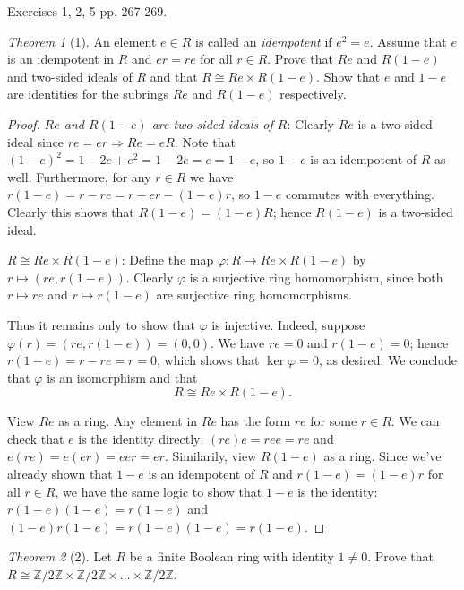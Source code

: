 \documentclass[12pt]{article}
\theoremstyle{remark}
\theoremstyle{named}
\newtheorem*{theorem}{Theorem}
\newcommand{\Z}{\mathbb Z}
\begin{document}
Exercises 1, 2, 5 pp. 267-269.

\begin{theorem}[1]
    An element \(e \in R\) is called an \textit{idempotent} if \(e^2 = e\). Assume that \(e\) is an idempotent in \(R\) and \(er = re\) for all \(r \in R\). Prove that \(Re\) and \(R(1 - e)\) and two-sided ideals of \(R\) and that \(R \cong Re \times R(1 - e)\). Show that \(e\) and \(1 - e\) are identities for the subrings \(Re\) and \(R(1 - e)\) respectively.
\end{theorem}

\begin{proof}
    \textit{\(Re\) and \(R(1 - e)\) are two-sided ideals of \(R\)}: Clearly \(Re\) is a two-sided ideal since \(re = er \Rightarrow Re = eR\). Note that \((1 - e)^2 = 1 - 2e + e^2 = 1 - 2e = e = 1 - e\), so \(1 - e\) is an idempotent of \(R\) as well. Furthermore, for any \(r \in R\) we have \(r(1 - e) = r - re = r - er - (1 - e)r\), so \(1 - e\) commutes with everything. Clearly this shows that \(R(1 - e) = (1 - e)R\); hence \(R(1 - e)\) is a two-sided ideal.

    \(R \cong Re \times R(1 - e)\): Define the map \(\varphi : R \to Re \times R(1 - e)\) by \(r \mapsto (re, r(1 - e))\). Clearly \(\varphi\) is a surjective ring homomorphism, since both \(r \mapsto re\) and \(r \mapsto r(1 - e)\) are surjective ring homomorphisms.

    Thus it remains only to show that \(\varphi\) is injective. Indeed, suppose \(\varphi(r) = (re, r(1 - e)) = (0, 0)\). We have \(re = 0\) and \(r(1 - e) = 0\); hence \(r(1 - e) = r - re = r = 0\), which shows that \(\ker \varphi = 0\), as desired. We conclude that \(\varphi\) is an isomorphism and that \[R \cong Re \times R(1 - e).\]

    View \(Re\) as a ring. Any element in \(Re\) has the form \(re\) for some \(r \in R\). We can check that \(e\) is the identity directly: \((re)e = ree = re\) and \(e(re) = e(er) = eer = er\). Similarily, view \(R(1 - e)\) as a ring. Since we've already shown that \(1 - e\) is an idempotent of \(R\) and \(r(1 - e) = (1 - e)r\) for all \(r \in R\), we have the same logic to show that \(1 - e\) is the identity: \(r(1 - e)(1 - e) = r(1 - e)\) and \((1 - e)r(1 - e) = r(1 - e)(1 - e) = r(1 - e)\).
\end{proof}

\begin{theorem}[2]
    Let \(R\) be a finite Boolean ring with identity \(1 \neq 0\). Prove that \(R \cong \Z / 2 \Z \times \Z / 2 \Z \times \dots \times \Z / 2 \Z\).
\end{theorem}
\end{document}
